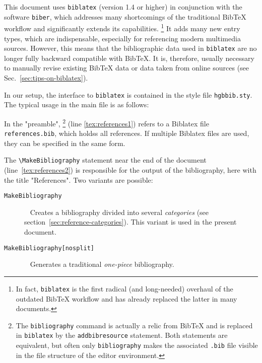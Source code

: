 This document uses \texttt{biblatex} (version 1.4 or higher) in conjunction with
the software \texttt{biber}, which addresses many shortcomings of the
traditional BibTeX workflow and significantly extends its capabilities.%
\footnote{In fact, \texttt{biblatex} is the first radical (and long-needed)
overhaul of the outdated BibTeX workflow and has already replaced the latter in
many documents.}
It adds many new entry types, which are indispensable, especially for
referencing modern multimedia sources. However, this means that the
bibliographic data used in \texttt{biblatex} are no longer fully backward
compatible with BibTeX. It is, therefore, usually necessary to manually revise
existing BibTeX data or data taken from online sources (see
Sec.~\ref{sec:tips-on-biblatex}).

In our setup, the interface to \texttt{biblatex} is contained in the style
file \nolinkurl{hgbbib.sty}. The typical usage in the main \latex file is as
follows:
%
%
In the "preamble",
\verb!!%
\footnote{The \texttt{{\bs}bibliography} command is actually a relic from BibTeX
and is replaced in \texttt{biblatex} by the \texttt{{\bs}addbibresource}
statement. Both statements are equivalent, but often only
\texttt{{\bs}bibliography} makes the associated \texttt{.bib} file visible in
the file structure of the editor environment.}
(line \ref{tex:references1}) refers to a Biblatex file \nolinkurl{references.bib},
which holdss all references.
If multiple Biblatex files are used, they can be specified in the same form.

The \verb!\MakeBibliography! statement near the end of the document
(line~\ref{tex:references2}) is responsible for the output of the bibliography,
here with the title "References". Two variants are possible:
%
\begin{description}
    \item[\texttt{{\bs}MakeBibliography}] ~ \newline
    Creates a bibliography divided into several \emph{categories} (see
    section~\ref{sec:reference-categories}). This variant is used in the present
    document.
%
    \item[\texttt{{\bs}MakeBibliography[nosplit]}] ~ \newline
    Generates a traditional \emph{one-piece} bibliography.
\end{description}

